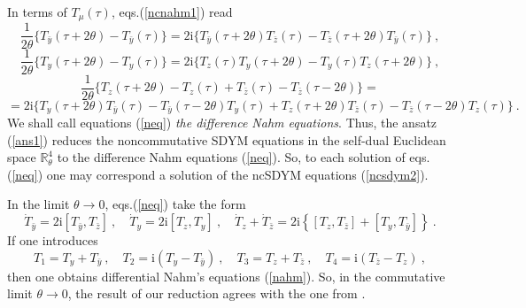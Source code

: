 \documentclass[a4paper,11pt]{article}
\numberwithin{equation}{section}
\def\m{\mu}
\newcommand{\im}{\mathrm{i}}
\newcommand{\zb}{{\bar{z}}}
\newcommand{\yb}{{\bar{y}}}
\newcommand{\td}{\dot{T}}
\newcommand{\rct}{{\mathbb{R}^4_\theta}}
\begin{document}
In terms of $T_\m (\tau )$,  eqs.(\ref{ncnahm1}) read
$$
\frac{1}{2\theta}\{ T_{\bar y}(\tau +2\theta) - T_{\bar y}(\tau) \}  =
 2\im  \{T_{\bar y}(\tau +2\theta )T_{\bar z}(\tau ) -
 T_{\bar z}(\tau + 2\theta ) T_{\bar y}(\tau )\}\ ,
$$
\begin{equation}
\frac{1}{2\theta}\{ T_y(\tau +2\theta ) - T_y(\tau ) \}  =
 2\im  \{T_z(\tau ) T_y(\tau +2\theta ) - T_y(\tau ) T_z(\tau +2\theta )\}\ ,
\label{neq}
\end{equation}
$$
\frac{1}{2\theta}\{ T_z(\tau +2\theta ) - T_z(\tau )  + T_{\bar z}(\tau ) -
 T_{\bar z}(\tau -2\theta ) \} =$$
$$
= 2\im \{ T_y(\tau +2\theta )T_{\bar y}(\tau ) - T_{\bar y}(\tau -2\theta )
T_y(\tau ) + T_z(\tau +2\theta )T_{\bar z}(\tau ) - 
T_{\bar z}(\tau -2\theta )T_z(\tau )\}\ .
$$
We shall call equations (\ref{neq}) {\it the difference Nahm equations}.
Thus, the ansatz  (\ref{ans1}) reduces
the noncommutative SDYM equations in the self-dual Euclidean
space $\rct$ to the difference Nahm equations (\ref{neq}).
So, to each solution of eqs.(\ref{neq}) one may correspond a solution of the 
ncSDYM equations (\ref{ncsdym2}).

In the limit $\theta \rightarrow 0$, eqs.(\ref{neq}) take the form
\begin{equation}
\td_{\yb}=2\im [T_{\yb},T_{\zb}]\ , \quad
\td_y=2\im [T_z,T_y] \ , \quad
\td_z+\td_{\zb}=2\im \left\{[T_z,T_{\zb}]+[T_y,T_{\yb}]\right\}\ .
\label{nah}
\end{equation}
If one introduces
$$
T_1=T_y+ T_\yb\ ,\quad  T_2=\im (T_y - T_\yb)\ , \quad 
T_3=T_z+T_\zb \ ,\quad  T_{4}=\im (T_\zb - T_z)\ ,
$$
then one obtains differential Nahm's equations (\ref{nahm}).
So, in the commutative limit $\theta \to 0$, the result of our reduction 
agrees with the one from \cite{Ivanova:tu}. 

\medskip
\end{document}
